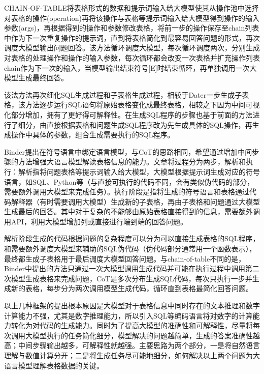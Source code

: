 CHAIN-OF-TABLE\cite{wang2024chain}将表格形式的数据和提示词输入给大模型使其从操作池中选择对表格的操作(operation)再将该操作与表格等提示词输入给大模型得到操作的输入参数(args)，再根据得到的操作和参数修改表格，将前一步的操作保存至chain列表中作为下一次重复操作的提示词，直到将表格简化到最容易回答问题的形式，再次调度大模型输出问题回答。该方法循环调度大模型，每次循环调度两次，分别生成对表格的处理操作和操作的输入参数，每次循环都会改变一次表格并扩充操作列表chain作为下一次的输入，当模型输出结束符号[E]时结束循环，再单独调用一次大模型生成最终回答。

该法方法再次细化SQL生成过程和子表格生成过程，相较于Dater\cite{ye2023large}一步生成子表格，该方法逐步运行SQL语句将原始表格变化成最终表格，相较之下因为中间可视化部分增加，拥有了更好得可解释性。在生成SQL程序的步骤也基于前面的方法进行了细分，由直接根据表格和问题生成SQL程序改为先生成具体的SQL操作，再生成操作中具体的参数，组合生成需要执行的SQL程序。

Binder\cite{chengbinding}提出在符号语言中绑定语言模型，与CoT\cite{wang2024chain}的思路相同，希望通过增加中间步骤的方法增强大语言模型解读表格信息的能力。文章将过程分为两步，解析和执行：解析指将问题表格等提示词输入给大模型，大模型根据提示词生成对应的符号语言，如SQL、Python等（与直接可执行的代码不同，会有类似伪代码的部分，需要额外调用大模型来完成任务）。执行阶段是指将生成的符号语言和表格通过代码解释器（有时需要调用大模型）生成新的子表格，再由子表格和问题通过大模型生成最后的回答。其中对于复杂的不能够由原始表格直接得到的信息，需要额外调用API，利用大模型增加列或直接进行端到端的回答问题。

解析阶段生成的代码根据问题的复杂程度可以分为可以直接生成表格的SQL程序，和需要额外调度大模型来辅助的SQL伪代码（伪代码部分通常用一个函数表示），最终都生成子表格用于最后调度大模型回答问题。与chain-of-table\cite{wang2024chain}不同的是，Binder中提出的方法只通过一次大模型调用生成代码并可能在执行过程中调用第二次模型生成表格来完成问题，CoT\cite{wang2024chain}是多次分布生成SQL代码，每次只执行一步并生成新的表格，每步分为两次调用模型生成代码，循环直到表格最简化回答问题。

以上几种框架的提出根本原因是大模型对于表格信息中同时存在的文本推理和数字计算能力不强，尤其是数字推理能力，所以引入SQL等编码语言将对数字的计算能力转化为对代码的生成能力。同时为了提高大模型的准确性和可解释性，尽量将每次调用大模型执行的任务简化细分，模型解决的问题越简单，生成的答案准确性越高；中间步骤输出越多，可解释性就越强。主要思路为两个部分，一是将自然语言理解与数值计算分开；二是将生成任务尽可能地细分，如何解决以上两个问题为大语言模型理解表格数据的关键。

